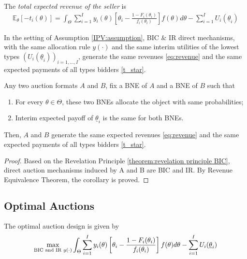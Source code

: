 \documentclass[11pt]{elegantbook}
\begin{document}
The \textit{total expected revenue of the seller} is
\begin{equation}
    \begin{aligned}
        \mathbb{E}_\theta[-t_i(\theta)]=\int_\Theta \sum_{i=1}^I y_i(\theta)\left[\theta_i-\frac{1-F_i(\theta_i)}{f_i(\theta_i)}\right]f(\theta)d\theta-\sum_{i=1}^IU_i(\underline{\theta}_i)
    \end{aligned}
    \label{eq:revenue}
\end{equation}

\begin{theorem}
    In the setting of Assumption \ref{IPV:assumption}, BIC $\&$ IR direct mechanisms, with the same allocation rule $y(\cdot)$ and the same interim utilities of the lowest types $(U_i(\underline{\theta}_i))_{i=1,...,I}$, generate the same revenues \eqref{eq:revenue} and the same expected payments of all types bidders \eqref{t_star}.
\end{theorem}
\begin{corollary}
    Any two auction formats $A$ and $B$, fix a BNE of $A$ and a BNE of $B$ such that
    \begin{enumerate}
        \item For every $\theta\in\Theta$, these two BNEs allocate the object with same probabilities;
        \item Interim expected payoff of $\underline{\theta}_i$ is the same for both BNEs.
    \end{enumerate}
    Then, $A$ and $B$ generate the same expected revenues \eqref{eq:revenue} and the same expected payments of all types bidders \eqref{t_star}.
\end{corollary}
\begin{proof}
    Based on the Revelation Principle \ref{theorem:revelation principle BIC}, direct auction mechanisms induced by A and B are BIC and IR. By Revenue Equivalence Theorem, the corollary is proved.
\end{proof}

\subsection{Optimal Auctions}
The optimal auction design is given by
\begin{equation}
    \begin{aligned}
        \max_{\textnormal{BIC and IR }y(\cdot)}\int_\Theta \sum_{i=1}^I y_i(\theta)\left[\theta_i-\frac{1-F_i(\theta_i)}{f_i(\theta_i)}\right]f(\theta)d\theta-\sum_{i=1}^IU_i(\underline{\theta}_i)
    \end{aligned}
    \nonumber
\end{equation}
\end{document}
